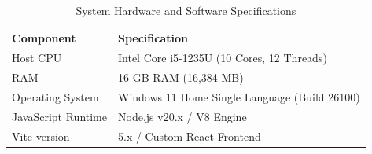 \begin{table}[htbp]
\caption{System Hardware and Software Specifications}
\label{tab:hardware_spec}
\centering
\begin{tabular}{ll}
\toprule
\textbf{Component} & \textbf{Specification} \\
\midrule
Host CPU             & Intel Core i5-1235U (10 Cores, 12 Threads) \\
RAM                  & 16 GB RAM (16,384 MB) \\
Operating System     & Windows 11 Home Single Language (Build 26100) \\
JavaScript Runtime   & Node.js v20.x / V8 Engine \\
Vite version         & 5.x / Custom React Frontend \\
\bottomrule
\end{tabular}
\end{table}

